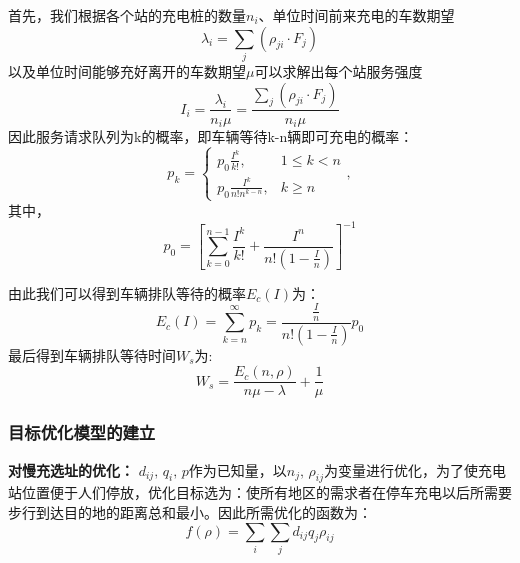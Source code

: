 \documentclass[12pt, a4paper, oneside]{ctexart}
\begin{document}
\begin{enumerate}[label = \roman*)]
        首先，我们根据各个站的充电桩的数量\(n_i\)、单位时间前来充电的车数期望
        \begin{equation}
            \lambda_i=\sum\limits_j(\rho_{ji}\cdot F_j)
        \end{equation}
        以及单位时间能够充好离开的车数期望\(\mu\)可以求解出每个站服务强度
        \begin{equation}
            I_i=\frac{\lambda_i}{n_i\mu}=\frac{\sum\limits_j(\rho_{ji}\cdot F_j)}{n_i\mu}
        \end{equation}
        因此服务请求队列为k的概率，即车辆等待k-n辆即可充电的概率：
        \begin{equation*}
            p_{k}=\begin{cases}
                p_{0} \frac{I^{k}}{k !}, &1 \leqslant k<n \\
                p_{0} \frac{I^{k}}{n ! n^{k-n}}, &k \geqslant n
            \end{cases},
        \end{equation*}
        其中，
        \begin{equation}
            p_{0}=\left[\sum_{k=0}^{n-1} \frac{I^{k}}{k !}+\frac{I^{n}}{n !\left(1-\frac{I}{n}\right)}\right]^{-1}
        \end{equation}

        由此我们可以得到车辆排队等待的概率\(E_c(I)\)为：
        \begin{equation}
            E_{c}(I)=\sum_{k=n}^{\infty} p_{k}=\frac{\frac{I}{n}}{n !\left(1-\frac{I}{n}\right)} p_{0}
        \end{equation}
        最后得到车辆排队等待时间\(W_s\)为:
        \begin{equation}
            W_s=\frac{E_{c}(n, \rho)}{n \mu-\lambda}+\frac{1}{\mu}
        \end{equation}
\end{enumerate}


\subsubsection{目标优化模型的建立}
\textbf{对慢充选址的优化：}
\(d_{ij},\,q_i,\,p\)作为已知量，以\(n_j,\,\rho_{ij}\)为变量进行优化，为了使充电站位置便于人们停放，优化目标选为：使所有地区的需求者在停车充电以后所需要步行到达目的地的距离总和最小。因此所需优化的函数为：
\begin{dmath}
    f(\rho)=\sum_i \sum_jd_{ij} q_j \rho_{ij}
\end{dmath}
\end{document}
